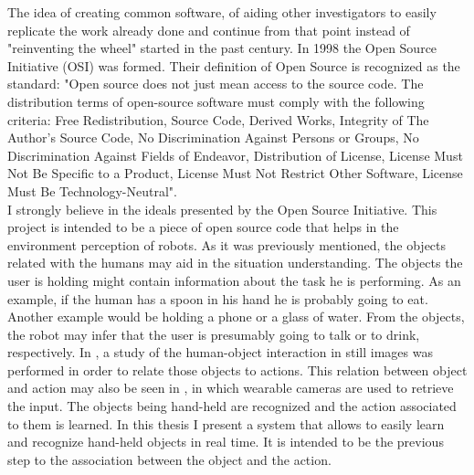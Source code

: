 

The idea of creating common software, of aiding other investigators to easily replicate the work already done and continue from that point instead of "reinventing the wheel" started in the past century. 
In 1998 the Open Source Initiative (OSI)\cite{osi} was formed. 
Their definition  of Open Source is recognized as the standard: "Open source does not just mean access to the source code. The distribution terms of open-source software must comply with the following criteria: Free Redistribution, Source Code, Derived Works, Integrity of The Author's Source Code, No Discrimination Against Persons or Groups, No Discrimination Against Fields of Endeavor, Distribution of License, License Must Not Be Specific to a Product, License Must Not Restrict Other Software,  License Must Be Technology-Neutral"\cite{osi_def}. 
\\

I strongly believe in the ideals presented by the Open Source Initiative. 
This project is intended to be a piece of open source code that helps in the environment perception of robots. 
As it was previously mentioned, the objects related with the humans may aid in the situation understanding. 
The objects the user is holding might contain information about the task he is performing. 
As an example, if the human has a spoon in his hand he is probably going to eat. 
Another example would be holding a phone or a glass of water. 
From the objects, the robot may infer that the user is presumably going to talk or to drink, respectively. 
	In \cite{Delaitre}, a study of the human-object interaction in still images was performed in order to relate those objects to actions. 
	This relation between object and action may also be seen in \cite{Fathi}, in which wearable cameras are used to retrieve the input. 
	The objects being hand-held are recognized and the action associated to them is learned. 
	In this thesis I present a system that allows to easily learn and recognize hand-held objects in real time. 
	It is intended to be the previous step to the association between the object and the action. 



